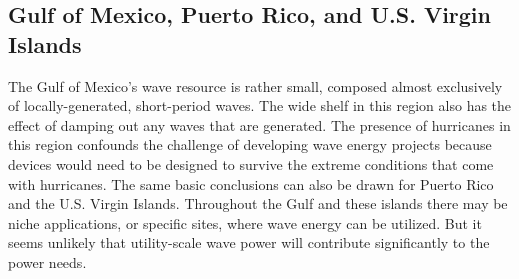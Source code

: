 \subsection{Gulf of Mexico, Puerto Rico, and U.S. Virgin Islands}

The Gulf of Mexico's wave resource is rather small, composed almost exclusively of locally-generated, short-period waves.  The wide shelf in this region also has the effect of damping out any waves that are generated. The presence of hurricanes in this region confounds the challenge of developing wave energy projects because devices would need to be designed to survive the extreme conditions that come with hurricanes. The same basic conclusions can also be drawn for Puerto Rico and the U.S. Virgin Islands. Throughout the Gulf and these islands there may be niche applications, or specific sites, where wave energy can be utilized. But it seems unlikely that utility-scale wave power will contribute significantly to the power needs.





